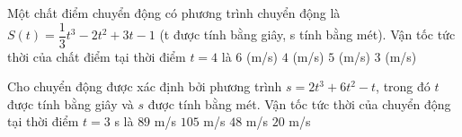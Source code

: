 \begin{ex}%
	Một chất điểm chuyển động  có phương trình chuyển động là $S(t)=\dfrac{1}{3}t^{3}-2t^{2}+3t-1$ (t được tính bằng giây, s tính bằng mét). Vận tốc tức thời của chất điểm tại thời điểm $t=4$ là
	\choice 
		 {$6$ (m/s)}
		{$4$ (m/s)} 
		{$5$  (m/s)}
		{\True $3$ (m/s)} 
\end{ex}

\begin{ex}%
	Cho chuyển động được xác định  bởi phương trình $s=2t^{3}+6t^{2}-t$, trong đó $t$ được tính bằng giây và $s$ được tính bằng mét. Vận tốc tức thời của chuyển động tại thời điểm $t=3$ s là
	\choice 
		{\True $89$  m/s}
		{$105$  m/s}
		{$48$ m/s} 
		{$20$  m/s}
\end{ex}

